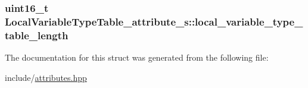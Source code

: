 \hypertarget{structLocalVariableTypeTable__attribute__s_a5f9d25f73fd3f886bc1052974cce379d}{
\subsubsection[{local\+\_\+variable\+\_\+type\+\_\+table\+\_\+length}]{\setlength{\rightskip}{0pt plus 5cm}uint16\+\_\+t Local\+Variable\+Type\+Table\+\_\+attribute\+\_\+s\+::local\+\_\+variable\+\_\+type\+\_\+table\+\_\+length}}\label{structLocalVariableTypeTable__attribute__s_a5f9d25f73fd3f886bc1052974cce379d}


The documentation for this struct was generated from the following file\+:\begin{DoxyCompactItemize}
\item 
include/\hyperlink{attributes_8hpp}{attributes.\+hpp}\end{DoxyCompactItemize}
